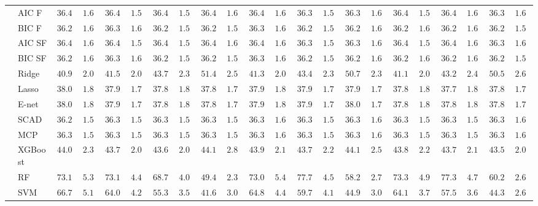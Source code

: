 \begin{tabular}{ll|ll|llllll|llllll|llllll}
 & AIC F  & $36.41$ & $1.60$ & $36.40$ & $1.59$ & $36.40$ & $1.58$ & $36.41$ & $1.60$ & $36.40$ & $1.60$ & $36.39$ & $1.58$ & $36.37$ & $1.60$ & $36.41$ & $1.58$ & $36.40$ & $1.61$ & $36.39$ & $1.61$ \\
 & BIC F  & $36.28$ & $1.60$ & $36.30$ & $1.60$ & $36.27$ & $1.59$ & $36.26$ & $1.58$ & $36.30$ & $1.60$ & $36.29$ & $1.59$ & $36.28$ & $1.62$ & $36.29$ & $1.60$ & $36.28$ & $1.60$ & $36.28$ & $1.59$ \\
 & AIC SF  & $36.41$ & $1.60$ & $36.40$ & $1.59$ & $36.40$ & $1.58$ & $36.41$ & $1.60$ & $36.40$ & $1.60$ & $36.39$ & $1.58$ & $36.37$ & $1.60$ & $36.41$ & $1.58$ & $36.40$ & $1.61$ & $36.39$ & $1.61$ \\
 & BIC SF  & $36.28$ & $1.60$ & $36.30$ & $1.60$ & $36.27$ & $1.59$ & $36.26$ & $1.58$ & $36.30$ & $1.60$ & $36.29$ & $1.59$ & $36.28$ & $1.62$ & $36.29$ & $1.60$ & $36.28$ & $1.60$ & $36.28$ & $1.59$ \\
 & Ridge  & $40.95$ & $2.01$ & $41.53$ & $2.02$ & $43.71$ & $2.31$ & $51.41$ & $2.54$ & $41.35$ & $2.08$ & $43.42$ & $2.32$ & $50.71$ & $2.31$ & $41.16$ & $2.09$ & $43.29$ & $2.44$ & $50.53$ & $2.65$ \\
 & Lasso  & $38.04$ & $1.82$ & $37.90$ & $1.76$ & $37.87$ & $1.81$ & $37.86$ & $1.79$ & $37.90$ & $1.84$ & $37.90$ & $1.78$ & $37.99$ & $1.73$ & $37.85$ & $1.88$ & $37.78$ & $1.82$ & $37.83$ & $1.78$ \\
 & E-net  & $38.04$ & $1.81$ & $37.91$ & $1.76$ & $37.87$ & $1.82$ & $37.88$ & $1.79$ & $37.90$ & $1.83$ & $37.91$ & $1.79$ & $38.01$ & $1.74$ & $37.86$ & $1.89$ & $37.81$ & $1.84$ & $37.84$ & $1.76$ \\
 & SCAD  & $36.29$ & $1.58$ & $36.32$ & $1.59$ & $36.33$ & $1.59$ & $36.33$ & $1.59$ & $36.32$ & $1.61$ & $36.32$ & $1.58$ & $36.32$ & $1.61$ & $36.31$ & $1.59$ & $36.32$ & $1.58$ & $36.33$ & $1.62$ \\
 & MCP  & $36.30$ & $1.58$ & $36.32$ & $1.59$ & $36.32$ & $1.59$ & $36.33$ & $1.59$ & $36.32$ & $1.61$ & $36.32$ & $1.58$ & $36.32$ & $1.61$ & $36.31$ & $1.59$ & $36.32$ & $1.58$ & $36.33$ & $1.62$ \\
 & XGBoost  & $44.01$ & $2.36$ & $43.77$ & $2.01$ & $43.65$ & $2.07$ & $44.17$ & $2.82$ & $43.91$ & $2.19$ & $43.78$ & $2.25$ & $44.12$ & $2.58$ & $43.87$ & $2.29$ & $43.71$ & $2.14$ & $43.52$ & $2.05$ \\
 & RF  & $73.13$ & $5.32$ & $73.15$ & $4.43$ & $68.75$ & $4.08$ & $49.43$ & $2.36$ & $73.01$ & $5.46$ & $77.77$ & $4.55$ & $58.20$ & $2.78$ & $73.33$ & $4.97$ & $77.34$ & $4.71$ & $60.24$ & $2.69$ \\
 & SVM  & $66.76$ & $5.12$ & $64.09$ & $4.27$ & $55.37$ & $3.53$ & $41.67$ & $3.02$ & $64.87$ & $4.45$ & $59.74$ & $4.16$ & $44.95$ & $3.05$ & $64.14$ & $3.79$ & $57.57$ & $3.65$ & $44.34$ & $2.68$ \\
\hline 
\end{tabular}


